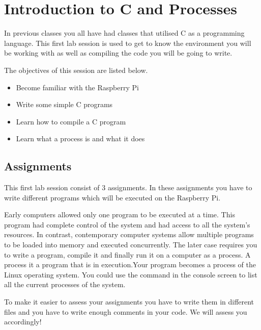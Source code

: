 \chapter[Session 1: Introduction to C and Processes]{Introduction to C and Processes}\label{chap:session1}
In previous classes you all have had classes that utilised C as a programming language. This first lab session is used to get to know the environment you will be working with as well as compiling the code you will be going to write.

The objectives of this session are listed below.
	\begin{itemize}
		\item Become familiar with the Raspberry Pi
		\item Write some simple C programs
		\item Learn how to compile a C program
		\item Learn what a process is and what it does
	\end{itemize}

\section{Assignments}
This first lab session consist of 3 assignments. In these assignments you have to write different programs which will be executed on the Raspberry Pi.

Early computers allowed only one program to be executed at a time. This program had complete control of the system and had access to all the system’s resources. In contrast, contemporary computer systems allow multiple programs to be loaded into memory and executed concurrently. The later case requires you to write a program, compile it and finally run it on a computer as a process. A process it a program that is in execution.Your program becomes a process of the Linux operating system. You could use the command  in the console screen to list all the current processes of the system. 

\begin{info}
To make it easier to assess your assignments you have to write them in different files and you have to write enough comments in your code. We will assess you accordingly!
\end{info}

